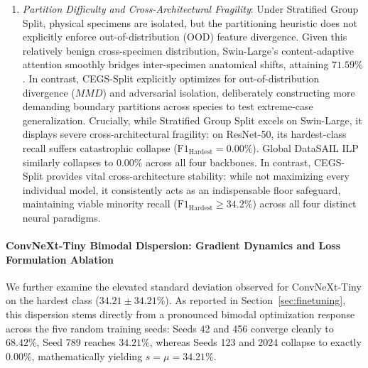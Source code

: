 \documentclass[a4paper,fleqn]{cas-sc}
\begin{document}
\begin{enumerate}
\item \emph{Partition Difficulty and Cross-Architectural Fragility}: Under \textsf{Stratified Group Split}, physical specimens are isolated, but the partitioning heuristic does not explicitly enforce out-of-distribution (OOD) feature divergence. Given this relatively benign cross-specimen distribution, Swin-Large's content-adaptive attention smoothly bridges inter-specimen anatomical shifts, attaining $71.59\%$. In contrast, CEGS-Split explicitly optimizes for out-of-distribution divergence ($MMD$) and adversarial isolation, deliberately constructing more demanding boundary partitions across species to test extreme-case generalization. Crucially, while \textsf{Stratified Group Split} excels on Swin-Large, it displays severe cross-architectural fragility: on ResNet-50, its hardest-class recall suffers catastrophic collapse ($\mathrm{F1}_{\text{Hardest}} = 0.00\%$). Global DataSAIL ILP similarly collapses to $0.00\%$ across all four backbones. In contrast, CEGS-Split provides vital cross-architecture stability: while not maximizing every individual model, it consistently acts as an indispensable floor safeguard, maintaining viable minority recall ($\mathrm{F1}_{\text{Hardest}} \ge 34.2\%$) across all four distinct neural paradigms.
\end{enumerate}

\paragraph{ConvNeXt-Tiny Bimodal Dispersion: Gradient Dynamics and Loss Formulation Ablation}
We further examine the elevated standard deviation observed for ConvNeXt-Tiny on the hardest class ($34.21 \pm 34.21\%$). As reported in Section~\ref{sec:finetuning}, this dispersion stems directly from a pronounced bimodal optimization response across the five random training seeds: Seeds 42 and 456 converge cleanly to $68.42\%$, Seed 789 reaches $34.21\%$, whereas Seeds 123 and 2024 collapse to exactly $0.00\%$, mathematically yielding $s = \mu = 34.21\%$.
\end{document}
